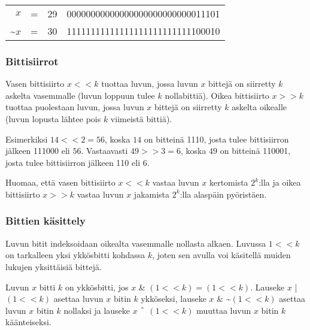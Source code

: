 \begin{center}
\begin{tabular}{rrrr}
$x$ & = & 29 &   00000000000000000000000000011101 \\
\textasciitilde$x$ & = & 30 & 11111111111111111111111111100010 \\
\end{tabular}
\end{center}

\subsubsection{Bittisiirrot}


Vasen bittisiirto $x < < k$ tuottaa luvun, jossa luvun $x$ bittejä
on siirretty $k$ askelta vasemmalle
(luvun loppuun tulee $k$ nollabittiä).
Oikea bittisiirto $x > > k$ tuottaa puolestaan
luvun, jossa luvun $x$ bittejä
on siirretty $k$ askelta oikealle 
(luvun lopusta lähtee pois $k$ viimeistä bittiä).

Esimerkiksi $14 < < 2 = 56$,
koska $14$ on bitteinä 1110,
josta tulee bittisiirron jälkeen 111000 eli $56$.
Vastaavasti $49 > > 3 = 6$,
koska $49$ on bitteinä 110001,
josta tulee bittisiirron jälkeen 110 eli $6$.

Huomaa, että vasen bittisiirto $x < < k$
vastaa luvun $x$ kertomista $2^k$:lla
ja oikea bittisiirto $x > > k$
vastaa luvun $x$ jakamista $2^k$:lla
alaspäin pyöristäen.

\subsubsection{Bittien käsittely}

Luvun bitit indeksoidaan oikealta vasemmalle
nollasta alkaen.
Luvussa $1 < < k$ on tarkalleen yksi ykkösbitti
kohdassa $k$, joten sen avulla voi käsitellä
muiden lukujen yksittäisiä bittejä.

Luvun $x$ bitti $k$ on ykkösbitti, jos
$x$ \& $(1 < < k) = (1 < < k)$.
Lauseke $x$ | $(1 < < k)$ asettaa luvun $x$ bitin $k$
ykköseksi, lauseke
$x$ \& \textasciitilde $(1 < < k)$
asettaa luvun $x$ bitin $k$ nollaksi ja
lauseke $x$ $\XOR$ $(1 < < k)$
muuttaa luvun $x$ bitin $k$ käänteiseksi.
% 
% 
% 

